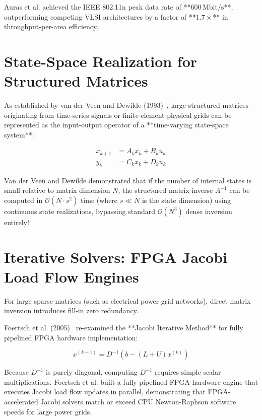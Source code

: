 Auras et al. achieved the IEEE 802.11n peak data rate of **$600\,\text{Mbit/s}$**, outperforming competing VLSI architectures by a factor of **$1.7\times$** in throughput-per-area efficiency.


\section{State-Space Realization for Structured Matrices}
As established by van der Veen and Dewilde (1993)~\cite{van1993large}, large structured matrices originating from time-series signals or finite-element physical grids can be represented as the input-output operator of a **time-varying state-space system**:

\begin{align}
x_{k+1} &= A_k x_k + B_k u_k \\
y_k &= C_k x_k + D_k u_k
\end{align}

Van der Veen and Dewilde demonstrated that if the number of internal states is small relative to matrix dimension $N$, the structured matrix inverse $A^{-1}$ can be computed in $\mathcal{O}(N \cdot s^2)$ time (where $s \ll N$ is the state dimension) using continuous state realizations, bypassing standard $\mathcal{O}(N^3)$ dense inversion entirely!


\section{Iterative Solvers: FPGA Jacobi Load Flow Engines}
For large sparse matrices (such as electrical power grid networks), direct matrix inversion introduces fill-in zero redundancy. 

Foertsch et al. (2005)~\cite{foertsch2005jacobi} re-examined the **Jacobi Iterative Method** for fully pipelined FPGA hardware implementation:

\begin{equation}
x^{(k+1)} = D^{-1} \left( b - (L + U) x^{(k)} \right)
\end{equation}

Because $D^{-1}$ is purely diagonal, computing $D^{-1}$ requires simple scalar multiplications. Foertsch et al. built a fully pipelined FPGA hardware engine that executes Jacobi load flow updates in parallel, demonstrating that FPGA-accelerated Jacobi solvers match or exceed CPU Newton-Raphson software speeds for large power grids.


